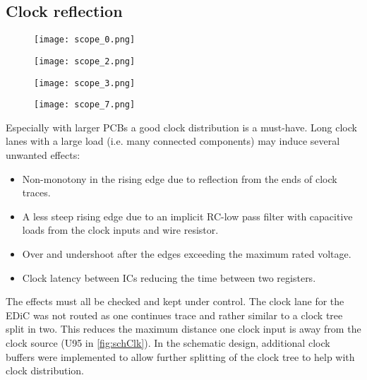 \subsection{Clock reflection}\label{sec:eval_clock}
\begin{sidewaysfigure}[p]
  \centering
  \begin{subfigure}[b]{.45\textwidth}
    \texttt{[image: scope\_0.png]}
    \label{fig:clkDefault}
  \end{subfigure}%
  \hspace{.05\textwidth}
  \begin{subfigure}[b]{.45\textwidth}
    \texttt{[image: scope\_2.png]}
    \label{fig:clk33Ohm}
  \end{subfigure}

  \begin{subfigure}[b]{.45\textwidth}
    \texttt{[image: scope\_3.png]}
    \label{fig:clkTerm}
  \end{subfigure}%
  \hspace{.05\textwidth}
  \begin{subfigure}[b]{.45\textwidth}
    \texttt{[image: scope\_7.png]}
    \label{fig:clkLatency}
  \end{subfigure}
  \caption[Comparison of the clock rising edge in different configurations.]{Comparison of the rising edge of the clock in different configurations. Measured close to the clock buffer (yellow) and in \cref{fig:clkLatency} at the end of a clock lane (U204 pin 8) (green).}
\end{sidewaysfigure}
Especially with larger \glspl{PCB} a good clock distribution is a must-have.
Long clock lanes with a large load (i.e. many connected components) may induce several unwanted effects:
\begin{itemize}
  \item Non-monotony in the rising edge due to reflection from the ends of clock traces.
  \item A less steep rising edge due to an implicit RC-low pass filter with capacitive loads from the clock inputs and wire resistor.
  \item Over and undershoot after the edges exceeding the maximum rated voltage.
  \item Clock latency between \glspl{IC} reducing the time between two registers.
\end{itemize}
The effects must all be checked and kept under control.
The clock lane for the \gls{EDiC} was not routed as one continues trace and rather similar to a clock tree split in two.
This reduces the maximum distance one clock input is away from the clock source (U95 in \cref{fig:schClk}).
In the schematic design, additional clock buffers were implemented to allow further splitting of the clock tree to help with clock distribution.

